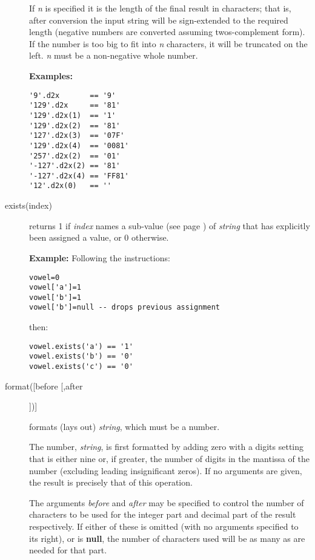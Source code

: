 \begin{description}
If \emph{n} is specified it is the length of the final result in
characters; that is, after conversion the input string will be
sign-extended to the required length (negative numbers are converted
assuming twos-complement form).
If the number is too big to fit into \emph{n} characters, it will be
truncated on the left.
\emph{n} must be a non-negative whole number.
 
\textbf{Examples:}
\begin{lstlisting}
'9'.d2x       == '9'
'129'.d2x     == '81'
'129'.d2x(1)  == '1'
'129'.d2x(2)  == '81'
'127'.d2x(3)  == '07F'
'129'.d2x(4)  == '0081'
'257'.d2x(2)  == '01'
'-127'.d2x(2) == '81'
'-127'.d2x(4) == 'FF81'
'12'.d2x(0)   == ''
\end{lstlisting}

\item[exists(index)]\label{refexists}

returns 1 if \emph{index} names a  sub-value (see page \pageref{refinstr})  of
\emph{string} that has explicitly been assigned a value, or 0
otherwise.
 
\textbf{Example:}
 Following the instructions:
\begin{lstlisting}
vowel=0
vowel['a']=1
vowel['b']=1
vowel['b']=null -- drops previous assignment
\end{lstlisting}
then:
\begin{lstlisting}
vowel.exists('a') == '1'
vowel.exists('b') == '0'
vowel.exists('c') == '0'
\end{lstlisting}

\item[format([before [,after]])]\label{refformat}

formats (lays out) \emph{string}, which must be a number.
 
The number, \emph{string}, is first formatted by adding zero with a
digits setting that is either nine or, if greater, the number of digits
in the mantissa of the number (excluding leading insignificant zeros).
If no arguments are given, the result is precisely that of this
operation.
 
The arguments \emph{before} and \emph{after} may be specified to
control the number of characters to be used for the integer part and
decimal part of the result respectively.  If either of these is omitted
(with no arguments specified to its right), or is \textbf{null}, the
number of characters used will be as many as are needed for that part.
 

\end{description}
